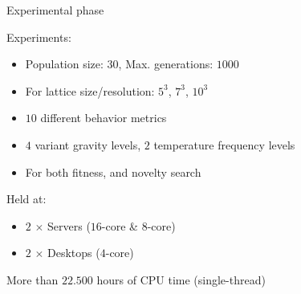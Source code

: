 \documentclass[6pt]{beamer}
\begin{document}

\begin{frame}{Experimental phase}
\begin{block}{Experiments:}
\begin{itemize}
\item Population size: $30$, Max. generations: $1000$
\item For lattice size/resolution: $5^3$, $7^3$, $10^3$
\item $10$ different behavior metrics
\item $4$ variant gravity levels, $2$ temperature frequency levels
\item For both fitness, and novelty search
\end{itemize}
\end{block}
\begin{block}{Held at:}
\begin{itemize}
\item $2$ $\times$ Servers ($16$-core \& $8$-core)
\item $2$ $\times$ Desktops ($4$-core)
\end{itemize}
\end{block}
\alert{More than $22.500$ hours of CPU time (single-thread)}
\end{frame}
\end{document}
